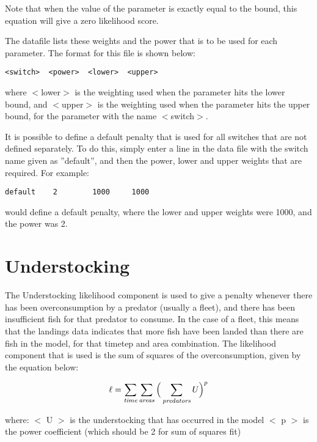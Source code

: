 \documentclass [a4paper, 10pt]{book}
\begin{document}
Note that when the value of the parameter is exactly equal to the bound, this equation will give a zero likelihood score.

\bigskip
The datafile lists these weights and the power that is to be used for each parameter.  The format for this file is shown below:

{\small\begin{verbatim}
<switch>  <power>  <lower>  <upper>
\end{verbatim}}

where $<$lower$>$ is the weighting used when the parameter hits the lower bound, and $<$upper$>$ is the weighting used when the parameter hits the upper bound, for the parameter with the name $<$switch$>$.

\bigskip
It is possible to define a default penalty that is used for all switches that are not defined separately.  To do this, simply enter a line in the data file with the switch name given as ''default'', and then the power, lower and upper weights that are required.  For example:

{\small\begin{verbatim}
default    2        1000     1000
\end{verbatim}}

would define a default penalty, where the lower and upper weights were 1000, and the power was 2.

\section{Understocking}\label{sec:understocking}
The Understocking likelihood component is used to give a penalty whenever there has been overconsumption by a predator (usually a fleet), and there has been insufficient fish for that predator to consume.  In the case of a fleet, this means that the landings data indicates that more fish have been landed than there are fish in the model, for that timetep and area combination.  The likelihood component that is used is the sum of squares of the overconsumption, given by the equation below:

\begin{equation}\label{eq:understocking}
\ell = \sum_{\it time}\sum_{\it areas} \Big(\sum_{\it predators} U \Big)^p
\end{equation}

where:\newline
$<$ U $>$ is the understocking that has occurred in the model\newline
$<$ p $>$ is the power coefficient (which should be 2 for sum of squares fit)
\end{document}
